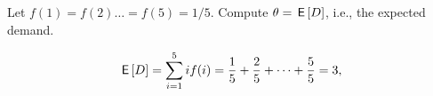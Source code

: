 \begin{exercise}
  Let $f(1)=f(2)\ldots=f(5) = 1/5$. Compute $\theta = \,\mathsf{E}\left[D\right]$, i.e., the expected demand.
  \begin{solution}
    \begin{align*}
      \,\mathsf{E}\left[D\right] &= \sum_{i=1}^5 i f(i) = \frac 1 5+\frac 2 5+\cdots+\frac 55 = 3, \\
    \end{align*}
  \end{solution}
\end{exercise}


\clearpage

